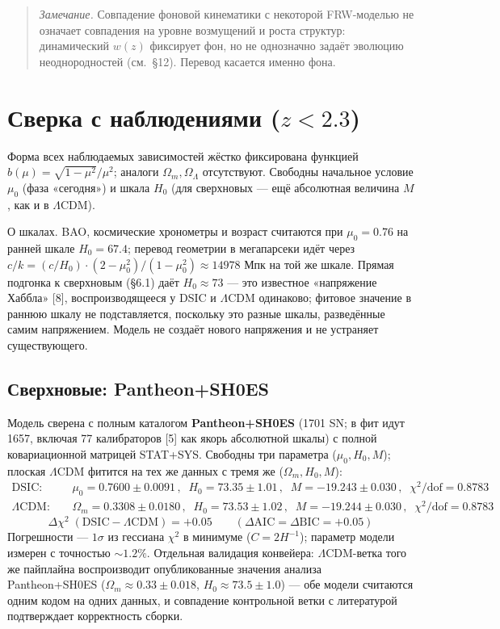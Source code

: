 \documentclass{article}
\begin{document}
\begin{quote}
\textit{Замечание.} Совпадение фоновой кинематики с некоторой FRW-моделью не означает совпадения на уровне возмущений и роста структур: динамический $w(z)$ фиксирует фон, но не однозначно задаёт эволюцию неоднородностей (см.\ \S12). Перевод касается именно фона.
\end{quote}
\section{Сверка с наблюдениями ($z < 2.3$)}

Форма всех наблюдаемых зависимостей жёстко фиксирована функцией $b(\mu) = \sqrt{1-\mu^2}/\mu^2$; аналоги $\Omega_m, \Omega_\Lambda$ отсутствуют. Свободны начальное условие $\mu_0$ (фаза «сегодня») и шкала $H_0$ (для сверхновых --- ещё абсолютная величина $M$, как и в $\Lambda$CDM).

О шкалах. BAO, космические хронометры и возраст считаются при $\mu_0 = 0.76$ на ранней шкале $H_0 = 67.4$; перевод геометрии в мегапарсеки идёт через $c/k = (c/H_0)\cdot(2-\mu_0^2)/(1-\mu_0^2) \approx 14978$ Мпк на той же шкале. Прямая подгонка к сверхновым (\S6.1) даёт $H_0 \approx 73$ --- это известное «напряжение Хаббла» [8], воспроизводящееся у DSIC и $\Lambda$CDM одинаково; фитовое значение в раннюю шкалу не подставляется, поскольку это разные шкалы, разведённые самим напряжением. Модель не создаёт нового напряжения и не устраняет существующего.

\subsection{Сверхновые: Pantheon+SH0ES}

Модель сверена с полным каталогом \textbf{Pantheon+SH0ES} (1701 SN; в фит идут 1657, включая 77 калибраторов [5] как якорь абсолютной шкалы) с полной ковариационной матрицей STAT+SYS. Свободны три параметра ($\mu_0, H_0, M$); плоская $\Lambda$CDM фитится на тех же данных с тремя же ($\Omega_m, H_0, M$):
\begin{align*}
\text{DSIC}: &\quad \mu_0 = 0.7600 \pm 0.0091\,, \;\; H_0 = 73.35 \pm 1.01\,, \;\; M = -19.243 \pm 0.030\,, \;\; \chi^2/\text{dof} = 0.8783 \\
\Lambda\text{CDM}: &\quad \Omega_m = 0.3308 \pm 0.0180\,, \;\; H_0 = 73.53 \pm 1.02\,, \;\; M = -19.244 \pm 0.030\,, \;\; \chi^2/\text{dof} = 0.8783
\end{align*}
\begin{equation*}
\Delta\chi^2\;(\text{DSIC} - \Lambda\text{CDM}) = +0.05 \qquad (\Delta\text{AIC} = \Delta\text{BIC} = +0.05)
\end{equation*}
Погрешности --- $1\sigma$ из гессиана $\chi^2$ в минимуме ($C = 2H^{-1}$); параметр модели измерен с точностью ${\sim}1.2\%$. Отдельная валидация конвейера: $\Lambda$CDM-ветка того же пайплайна воспроизводит опубликованные значения анализа Pantheon+SH0ES ($\Omega_m \approx 0.33 \pm 0.018$, $H_0 \approx 73.5 \pm 1.0$) --- обе модели считаются одним кодом на одних данных, и совпадение контрольной ветки с литературой подтверждает корректность сборки.
\end{document}

